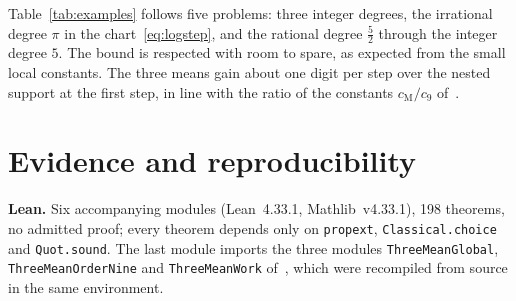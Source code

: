 \documentclass[10pt,a4paper]{article}
\theoremstyle{plain}
\theoremstyle{remark}
\numberwithin{equation}{section}
\newcommand{\lean}[1]{\texttt{#1}}
\begin{document}
Table~\ref{tab:examples} follows five problems: three integer degrees, the irrational degree $\pi$
in the chart~\eqref{eq:logstep}, and the rational degree $\frac52$ through the integer degree $5$.
The bound is respected with room to spare, as expected from the small local constants. The three
means gain about one digit per step over the nested support at the first step, in line with the
ratio of the constants $c_{\mathrm M}/c_9$ of~\cite{v29}.

\section{Evidence and reproducibility}\label{sec:evidence}

\textbf{Lean.} Six accompanying modules (Lean~4.33.1, Mathlib~v4.33.1), 198 theorems, no admitted
proof; every theorem depends only on \lean{propext}, \lean{Classical.choice} and \lean{Quot.sound}.
The last module imports the three modules \lean{ThreeMeanGlobal}, \lean{ThreeMeanOrderNine} and
\lean{ThreeMeanWork} of~\cite{v29}, which were recompiled from source in the same environment.
\end{document}
